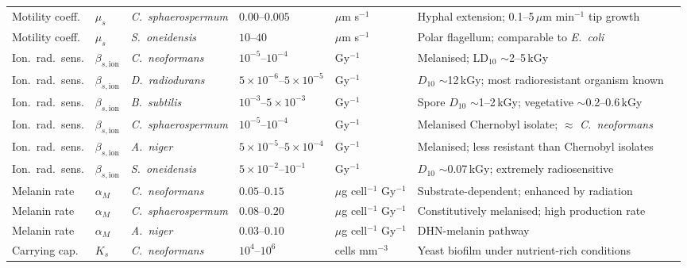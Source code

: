 \documentclass[11pt]{article}
\begin{document}
\begin{landscape}
\begin{table}[htbp]
{\begin{tabular}{@{}p{2.1cm}lp{3.0cm}p{3.0cm}lp{5.2cm}c@{}}
Motility coeff. & $\mu_s$ & \textit{C.\ sphaerospermum}& $0.00$--$0.005$ & $\mu$m s$^{-1}$ & Hyphal extension; 0.1--5\,$\mu$m min$^{-1}$ tip growth & \cite{shunk2022} \\
Motility coeff. & $\mu_s$ & \textit{S.\ oneidensis}    & $10$--$40$      & $\mu$m s$^{-1}$ & Polar flagellum; comparable to \textit{E.\ coli} & \cite{heidelberg2002} \\
\midrule
Ion.\ rad.\ sens. & $\beta_{s,\mathrm{ion}}$ & \textit{C.\ neoformans}     & $10^{-5}$--$10^{-4}$              & Gy$^{-1}$ & Melanised; LD$_{10}$ $\sim$2--5\,kGy & \cite{dadachova2007,dadachova2008} \\
Ion.\ rad.\ sens. & $\beta_{s,\mathrm{ion}}$ & \textit{D.\ radiodurans}    & $5\!\times\!10^{-6}$--$5\!\times\!10^{-5}$ & Gy$^{-1}$ & $D_{10}$ $\sim$12\,kGy; most radioresistant organism known & \cite{slade2011,daly2009} \\
Ion.\ rad.\ sens. & $\beta_{s,\mathrm{ion}}$ & \textit{B.\ subtilis}       & $10^{-3}$--$5\!\times\!10^{-3}$  & Gy$^{-1}$ & Spore $D_{10}$ $\sim$1--2\,kGy; vegetative $\sim$0.2--0.6\,kGy & \cite{nicholson2000} \\
Ion.\ rad.\ sens. & $\beta_{s,\mathrm{ion}}$ & \textit{C.\ sphaerospermum} & $10^{-5}$--$10^{-4}$              & Gy$^{-1}$ & Melanised Chernobyl isolate; $\approx$ \textit{C.\ neoformans} & \cite{zhdanova2000,shunk2022} \\
Ion.\ rad.\ sens. & $\beta_{s,\mathrm{ion}}$ & \textit{A.\ niger}          & $5\!\times\!10^{-5}$--$5\!\times\!10^{-4}$ & Gy$^{-1}$ & Melanised; less resistant than Chernobyl isolates & \cite{dadachova2008} \\
Ion.\ rad.\ sens. & $\beta_{s,\mathrm{ion}}$ & \textit{S.\ oneidensis}     & $5\!\times\!10^{-2}$--$10^{-1}$  & Gy$^{-1}$ & $D_{10}$ $\sim$0.07\,kGy; extremely radiosensitive & \cite{daly2009} \\
\midrule
Melanin rate & $\alpha_M$ & \textit{C.\ neoformans}     & $0.05$--$0.15$ & $\mu$g cell$^{-1}$ Gy$^{-1}$ & Substrate-dependent; enhanced by radiation & \cite{dadachova2007} \\
Melanin rate & $\alpha_M$ & \textit{C.\ sphaerospermum} & $0.08$--$0.20$ & $\mu$g cell$^{-1}$ Gy$^{-1}$ & Constitutively melanised; high production rate & \cite{zhdanova2000,shunk2022} \\
Melanin rate & $\alpha_M$ & \textit{A.\ niger}          & $0.03$--$0.10$ & $\mu$g cell$^{-1}$ Gy$^{-1}$ & DHN-melanin pathway & \cite{dadachova2008} \\
\midrule
Carrying cap. & $K_s$ & \textit{C.\ neoformans}    & $10^4$--$10^6$ & cells mm$^{-3}$ & Yeast biofilm under nutrient-rich conditions & \cite{dadachova2007} \\

\end{tabular}}
\end{table}
\end{landscape}
\end{document}
